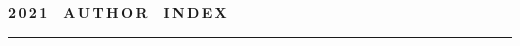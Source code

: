\newpage

\def\stat{cont-e}
{%
\raggedleft\Large \bf%
2\,0\,2\,1\ \ A\,U\,T\,H\,O\,R\ \ I\,N\,D\,E\,X \vskip 17pt
 \hrule
 \par
{} }

\label{st\stat}

\def\tit{\ }

\def\aut{\ }
\def\auf{\ }

\def\leftkol{\ } %

\def\rightkol{\ } %

\titele{\tit}{\aut}{\auf}{\leftkol}{\rightkol}

\def\leftfootline{\small{\textbf{\thepage}
\hfill INFORMATIKA I EE PRIMENENIYA~--- INFORMATICS AND APPLICATIONS\ \ \ 2021\
\ \ volume~15\ \ \ issue\ 4}
}%
 \def\rightfootline{\small{INFORMATIKA I EE PRIMENENIYA~--- INFORMATICS AND APPLICATIONS\ \ \ 2021\ \ \ volume~15\ \ \ issue\ 4
\hfill \textbf{\thepage}}}

\vspace*{-24pt}

